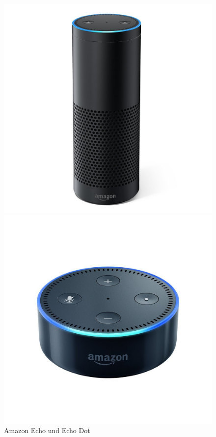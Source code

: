 \begin{figure}[h]
  \centering
  \begin{minipage}[b]{0.4\textwidth}
    \includegraphics[width=\textwidth]{bilder/2_amazonEcho.jpg}
  \end{minipage}
  \begin{minipage}[b]{0.4\textwidth}
    \includegraphics[width=\textwidth]{bilder/2_amazonEchoDot.jpg}
  \end{minipage}
  \caption{Amazon Echo und Echo Dot}
  \label{fig:amazon-echos}
\end{figure}

